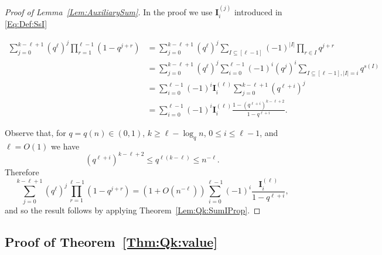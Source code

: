 \documentclass[letterpaper,11pt]{article}
\theoremstyle{definition}
\theoremstyle{remark}
\renewcommand{\le}{\leqslant}
\renewcommand{\ge}{\geqslant}
\renewcommand{\leq}{\leqslant}
\newcommand{\sumI}{\mathbf{I}}
\begin{document}
\begin{proof}[Proof of Lemma~\ref{Lem:AuxiliarySum}]
	In the proof we use $\sumI^{(j)}_{i}$ introduced in \eqref{Eq:Def:SsI} 
	
	\begin{align*}
		\sum_{j=0}^{k-\ell+1}\left(q^{\ell}\right)^j\prod_{r=1}^{\ell-1}(1-q^{j+r})
		&=\sum_{j=0}^{k-\ell+1}\left(q^{\ell}\right)^j\sum_{I\subseteq [\ell-1]}(-1)^{|I|}\prod_{r\in I}q^{j+r}\\
		&=\sum_{j=0}^{k-\ell+1}\left(q^{\ell}\right)^j
		\sum_{i=0}^{\ell-1}(-1)^i(q^{j})^i\sum_{I\subseteq [\ell-1], |I|=i}q^{s(I)}\\
		&=\sum_{i=0}^{\ell-1}(-1)^i\sumI^{(\ell)}_{i}\sum_{j=0}^{k-\ell+1}\left(q^{\ell+i}\right)^j\\
		&=\sum_{i=0}^{\ell-1}(-1)^i\sumI^{(\ell)}_{i}\frac{1-(q^{\ell+i})^{k-\ell+2}}{1-q^{\ell+i}}.
	\end{align*}
	
	Observe that, for $q=q(n)\in (0,1)$, $k\ge \ell -\log_q n$,  $0\le i\le \ell-1$, and $\ell=O(1)$ we have
	\[
	(q^{\ell+i})^{k-\ell+2}\le  q^{\ell(k-\ell)}  \leq    n^{-\ell}.
	\]
	Therefore
	\[
	\sum_{j=0}^{k-\ell+1}\left(q^{\ell}\right)^j\prod_{r=1}^{\ell-1}(1-q^{j+r})
	= 
	(1+ O(n^{-\ell}) )\sum_{i=0}^{\ell-1}(-1)^i\frac{\sumI^{(\ell)}_{i}}{1-q^{\ell+i}}, 
	\]and so the result follows by applying Theorem~\ref{Lem:Qk:SumIProp}.
\end{proof}



\subsection{Proof of Theorem~\ref{Thm:Qk:value}}
\end{document}
